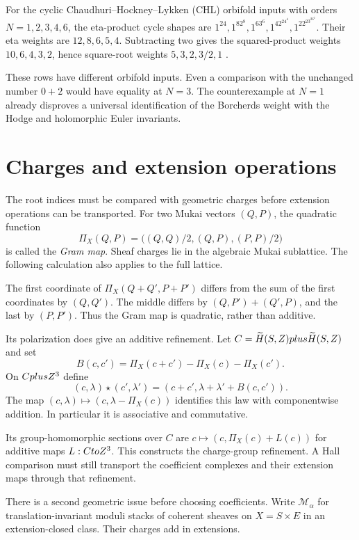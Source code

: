 For the cyclic Chaudhuri--Hockney--Lykken (CHL) orbifold inputs with
orders \(N=1,2,3,4,6\), the eta-product cycle shapes are
\(1^{24},1^82^8,1^63^6,1^42^24^4,1^22^23^26^2\).
Their eta weights are \(12,8,6,5,4\). Subtracting two gives the
squared-product weights \(10,6,4,3,2\), hence square-root weights
\(5,3,2,3/2,1\) \cite[Table 1, \S3]{GK10Composite}.

These rows have different orbifold inputs. Even a comparison with
the unchanged number \(0+2\) would have equality at \(N=3\).
The counterexample
at \(N=1\) already disproves a universal identification of the
Borcherds weight with the Hodge and holomorphic Euler invariants.


\section{Charges and extension operations}
\label{op:sec:operations}

The root indices must be compared with geometric charges before
extension operations can be transported.
For two Mukai vectors $(Q,P)$, the quadratic function
\[
 \Pi_X(Q,P)=\bigl((Q,Q)/2,(Q,P),(P,P)/2\bigr)
\]
is called the \emph{Gram map}. Sheaf charges lie in the
algebraic Mukai sublattice. The following calculation also
applies to the full lattice.

The first coordinate of \(\Pi_X(Q+Q',P+P')\) differs from the
sum of the first coordinates by \((Q,Q')\). The middle differs
by \((Q,P')+(Q',P)\), and the last by \((P,P')\).
Thus the Gram map is quadratic, rather than additive.

Its polarization does give an additive refinement.
Let $C=\widetilde H(S,Z)plus\widetilde H(S,Z)$ and set
\[
 B(c,c')=\Pi_X(c+c')-\Pi_X(c)-\Pi_X(c').
\]
On $CplusZ^3$ define
\begin{equation}\label{op:eq:polarized-charge}
 (c,\lambda)\star(c',\lambda')
       =(c+c',\lambda+\lambda'+B(c,c')).
\end{equation}
The map $(c,\lambda)\mapsto(c,\lambda-\Pi_X(c))$
identifies this law with componentwise addition.
In particular it is associative and commutative.

Its group-homomorphic sections over $C$ are
$c\mapsto(c,\Pi_X(c)+L(c))$ for additive maps $L:CtoZ^3$.
This constructs the charge-group refinement.
A Hall comparison must still transport the coefficient complexes
and their extension maps through that refinement.

There is a second geometric issue before choosing coefficients.
Write $\mathcal M_\alpha$ for translation-invariant moduli stacks
of coherent sheaves on $X=S\times E$ in an extension-closed class.
Their charges add in extensions.

